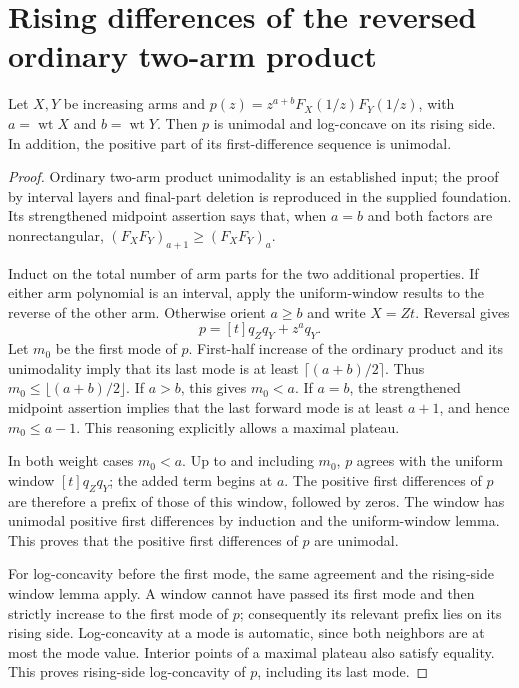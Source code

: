 \section{Rising differences of the reversed ordinary two-arm product}
\begin{proposition}
Let $X,Y$ be increasing arms and
$p(z)=z^{a+b}F_X(1/z)F_Y(1/z)$, with $a=\operatorname{wt}X$
and $b=\operatorname{wt}Y$. Then $p$ is unimodal and log-concave
on its rising side. In addition, the positive part of its
first-difference sequence is unimodal.
\end{proposition}
\begin{proof}
Ordinary two-arm product unimodality is an established input;
the proof by interval layers and final-part deletion is reproduced
in the supplied foundation. Its strengthened midpoint assertion
says that, when $a=b$ and both factors are nonrectangular,
$(F_XF_Y)_{a+1}\ge(F_XF_Y)_a$.

Induct on the total number of arm parts for the two additional
properties. If either arm polynomial is an interval, apply the
uniform-window results to the reverse of the other arm. Otherwise
orient $a\ge b$ and write $X=Zt$. Reversal gives
\[
 p=[t]q_Zq_Y+z^a q_Y.
\]
Let $m_0$ be the first mode of $p$. First-half increase of the
ordinary product and its unimodality imply that its last mode
is at least $\lceil(a+b)/2\rceil$. Thus
$m_0\le\lfloor(a+b)/2\rfloor$. If $a>b$, this gives $m_0<a$.
If $a=b$, the strengthened midpoint assertion implies that the
last forward mode is at least $a+1$, and hence $m_0\le a-1$.
This reasoning explicitly allows a maximal plateau.

In both weight cases $m_0<a$. Up to and including
$m_0$, $p$ agrees with the uniform window $[t]q_Zq_Y$; the
added term begins at $a$. The positive first differences of
$p$ are therefore a prefix of those of this window, followed
by zeros. The window has unimodal positive first differences
by induction and the uniform-window lemma. This proves that
the positive first differences of $p$ are unimodal.

For log-concavity before the first mode, the same agreement
and the rising-side window lemma apply. A window cannot have
passed its first mode and then strictly increase to the first
mode of $p$; consequently its relevant prefix lies on its
rising side. Log-concavity at a mode is automatic, since both
neighbors are at most the mode value. Interior points of a
maximal plateau also satisfy equality. This proves rising-side
log-concavity of $p$, including its last mode.
\end{proof}

